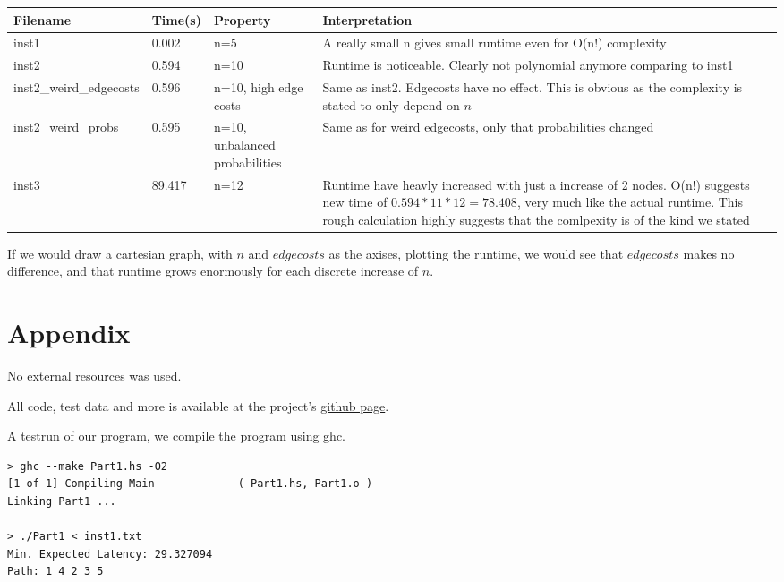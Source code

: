 \documentclass[a4paper,11pt]{article}
\begin{document}
\begin{center}
    \begin{tabular}{ | l | l | p{4cm} | p{5cm} |}
    \hline
    Filename & Time(s) & Property & Interpretation \\ \hline
    inst1 & 0.002 & n=5 & A really small n gives small runtime even for O(n!) complexity\\ \hline
    inst2 & 0.594 & n=10 & Runtime is noticeable. Clearly not polynomial anymore comparing to inst1 \\ \hline
    inst2\_weird\_edgecosts & 0.596 & n=10, high edge costs & Same as inst2. Edgecosts have no effect.
        This is obvious as the complexity is stated to only depend on $n$ \\ \hline
    inst2\_weird\_probs & 0.595 & n=10, unbalanced probabilities & Same as for weird edgecosts, only that probabilities changed \\ \hline
    inst3 & 89.417 & n=12 & Runtime have heavly increased with just a increase of 2 nodes.
        O(n!) suggests new time of $0.594*11*12=78.408$, very much like the actual runtime. 
        This rough calculation highly suggests that the comlpexity is of the kind we stated \\ \hline
    \end{tabular}
\end{center}

If we would draw a cartesian graph, with $n$ and $edgecosts$ as the axises, plotting the runtime,
we would see that $edgecosts$ makes no difference, and that runtime grows enormously for each
discrete increase of $n$.

\section{Appendix}
No external resources was used.

All code, test data and more is available at the project's \href{https://github.com/bisforboman/Algorithms-TIN092}{github page}.

A testrun of our program, we compile the program using ghc.

\begin{lstlisting}
> ghc --make Part1.hs -O2
[1 of 1] Compiling Main             ( Part1.hs, Part1.o )
Linking Part1 ...

> ./Part1 < inst1.txt 
Min. Expected Latency: 29.327094
Path: 1 4 2 3 5

\end{lstlisting}
\end{document}
